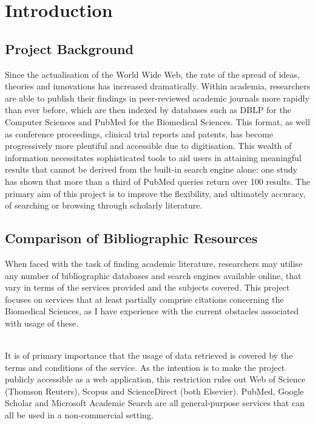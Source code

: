 \documentclass[PROP_AGutteridge_CS.tex]{subfiles}
\begin{document}
\chapter{Introduction}
\section{Project Background}
Since the actualisation of the World Wide Web, the rate of the spread of ideas, theories and innovations has increased dramatically. Within academia, researchers are able to publish their findings in peer-reviewed academic journals more rapidly than ever before, which are then indexed by databases such as DBLP for the Computer Sciences and PubMed for the Biomedical Sciences. This format, as well as conference proceedings, clinical trial reports and patents, has become progressively more plentiful and accessible due to digitisation. This wealth of information necessitates sophisticated tools to aid users in attaining meaningful results that cannot be derived from the built-in search engine alone: one study has shown that more than a third of PubMed queries return over 100 results\cite{dogan}. The primary aim of this project is to improve the flexibility, and ultimately accuracy, of searching or browsing through scholarly literature. 

\section{Comparison of Bibliographic Resources}
When faced with the task of finding academic literature, researchers may utilise any number of bibliographic databases and search engines available online, that vary in terms of the services provided and the subjects covered. This project focuses on services that at least partially comprise citations concerning the Biomedical Sciences, as I have experience with the current obstacles associated with usage of these.

\noindent \\ It is of primary importance that the usage of data retrieved is covered by the terms and conditions of the service. As the intention is to make the project publicly accessible as a web application, this restriction rules out Web of Science (Thomson Reuters), Scopus and ScienceDirect (both Elsevier). PubMed, Google Scholar and Microsoft Academic Search are all general-purpose services that can all be used in a non-commercial setting.
\end{document}
